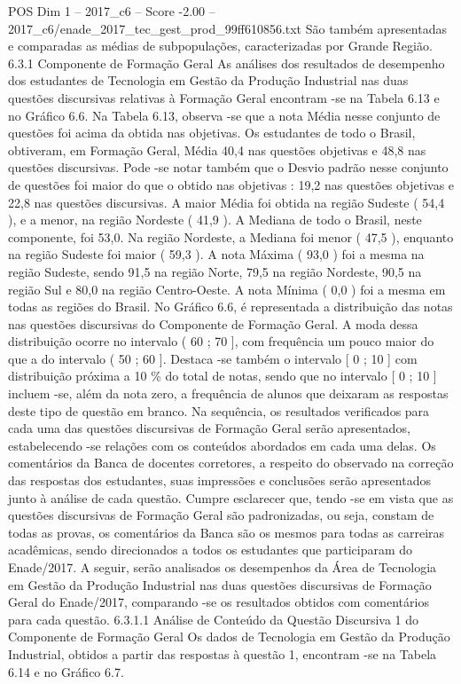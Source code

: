 \begin{textsample}{POS Dim 1 – 2017\_c6 – Score -2.00 – 2017\_c6/enade\_2017\_tec\_gest\_prod\_99ff610856.txt}
São também apresentadas e comparadas as médias de subpopulações, caracterizadas por Grande Região. 6.3.1 Componente de Formação Geral As análises dos resultados de desempenho dos estudantes de Tecnologia em Gestão da Produção Industrial nas duas questões discursivas relativas à Formação Geral encontram -se na Tabela 6.13 e no Gráfico 6.6.
Na Tabela 6.13, observa -se que a nota Média nesse conjunto de questões foi acima da obtida nas objetivas.
Os estudantes de todo o Brasil, obtiveram, em Formação Geral, Média 40,4 nas questões objetivas e 48,8 nas questões discursivas.
Pode -se notar também que o Desvio padrão nesse conjunto de questões foi maior do que o obtido nas objetivas : 19,2 nas questões objetivas e 22,8 nas questões discursivas.
A maior Média foi obtida na região Sudeste ( 54,4 ), e a menor, na região Nordeste ( 41,9 ).
A Mediana de todo o Brasil, neste componente, foi 53,0.
Na região Nordeste, a Mediana foi menor ( 47,5 ), enquanto na região Sudeste foi maior ( 59,3 ).
A nota Máxima ( 93,0 ) foi a mesma na região Sudeste, sendo 91,5 na região Norte, 79,5 na região Nordeste, 90,5 na região Sul e 80,0 na região Centro-Oeste.
A nota Mínima ( 0,0 ) foi a mesma em todas as regiões do Brasil.
No Gráfico 6.6, é representada a distribuição das notas nas questões discursivas do Componente de Formação Geral.
A moda dessa distribuição ocorre no intervalo ( 60 ; 70 ], com frequência um pouco maior do que a do intervalo ( 50 ; 60 ].
Destaca -se também o intervalo [ 0 ; 10 ] com distribuição próxima a 10 \% do total de notas, sendo que no intervalo [ 0 ; 10 ] incluem -se, além da nota zero, a frequência de alunos que deixaram as respostas deste tipo de questão em branco.
Na sequência, os resultados verificados para cada uma das questões discursivas de Formação Geral serão apresentados, estabelecendo -se relações com os conteúdos abordados em cada uma delas.
Os comentários da Banca de docentes corretores, a respeito do observado na correção das respostas dos estudantes, suas impressões e conclusões serão apresentados junto à análise de cada questão.
Cumpre esclarecer que, tendo -se em vista que as questões discursivas de Formação Geral são padronizadas, ou seja, constam de todas as provas, os comentários da Banca são os mesmos para todas as carreiras acadêmicas, sendo direcionados a todos os estudantes que participaram do Enade/2017.
A seguir, serão analisados os desempenhos da Área de Tecnologia em Gestão da Produção Industrial nas duas questões discursivas de Formação Geral do Enade/2017, comparando -se os resultados obtidos com comentários para cada questão. 6.3.1.1 Análise de Conteúdo da Questão Discursiva 1 do Componente de Formação Geral Os dados de Tecnologia em Gestão da Produção Industrial, obtidos a partir das respostas à questão 1, encontram -se na Tabela 6.14 e no Gráfico 6.7.

\end{textsample}
